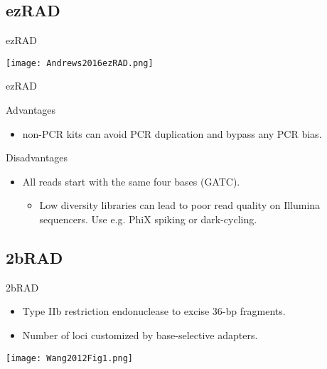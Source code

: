 \documentclass[presentation]{beamer}
\begin{document}
\subsection{ezRAD}
\label{sec-2-3}

\begin{frame}[label=sec-2-3-1]{ezRAD \citep{Toonen2013}}
\begin{center}
\texttt{[image: Andrews2016ezRAD.png]}


\tiny{\citep{Andrews2016}}
\end{center}
\end{frame}
\begin{frame}[label=sec-2-3-2]{ezRAD \citep{Toonen2013}}
\begin{block}{Advantages}
\begin{itemize}
\item non-PCR kits can avoid PCR duplication and bypass any PCR bias.
\end{itemize}
\end{block}
\begin{block}{Disadvantages}
\begin{itemize}
\item All reads start with the same four bases (GATC).
\begin{itemize}
\item Low diversity libraries can lead to poor read quality on Illumina
sequencers. Use e.g. PhiX spiking or dark-cycling.
\end{itemize}
\end{itemize}
\end{block}
\end{frame}

\subsection{2bRAD}
\label{sec-2-4}
\begin{frame}[label=sec-2-4-1]{2bRAD \citep{Wang2012}}
\begin{itemize}
\item Type IIb restriction endonuclease to excise 36-bp fragments.
\item Number of loci customized by base-selective adapters.
\end{itemize}

\begin{center}
\texttt{[image: Wang2012Fig1.png]}


\tiny{\citep{Wang2012}}
\end{center}
\end{frame}
\end{document}
